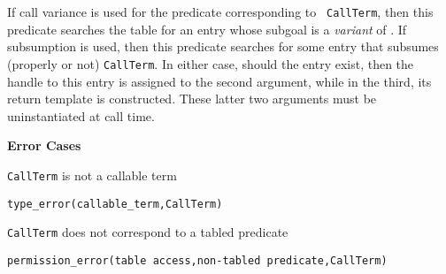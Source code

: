 \begin{description}



%
If call variance is used for the predicate corresponding to {\tt
  CallTerm}, then this predicate searches the table for an entry whose
subgoal is a \emph{variant} of .  If subsumption is
used, then this predicate searches for some entry that subsumes
(properly or not) {\tt CallTerm}.  In either case, should the entry
exist, then the handle to this entry is assigned to the second
argument, while in the third, its return template is constructed.
These latter two arguments must be uninstantiated at call time.

{\bf Error Cases}
\bi
\item {\tt CallTerm} is not a callable term
\bi
\item {\tt type\_error(callable\_term,CallTerm)}
\ei
\item {\tt CallTerm} does not correspond to a tabled predicate
\bi
\item 	{\tt permission\_error(table access,non-tabled predicate,{\tt CallTerm})}

\ei
\ei
\ \\
\begin{minipage}{6in}
\end{minipage}
\end{description}
